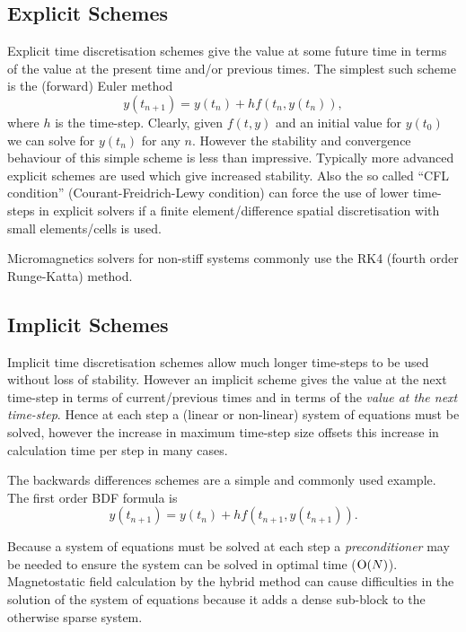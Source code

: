 \subsection{Explicit Schemes}
\label{sec:explicit-schemes}

Explicit time discretisation schemes give the value at some future time in terms of the value at the present time and/or previous times. The simplest such scheme is the (forward) Euler method
\begin{equation}
  \label{eq:44}
  y(t_{n+1}) = y(t_n) + h f(t_n,y(t_n)),
\end{equation}
where $h$ is the time-step. Clearly, given $f(t,y)$ and an initial value for $y(t_0)$ we can solve for $y(t_n)$ for any $n$. However the stability and convergence behaviour of this simple scheme is less than impressive. Typically more advanced explicit schemes are used which give increased stability.\cite{Atkinson2009} Also the so called ``CFL condition'' (Courant-Freidrich-Lewy condition) can force the use of lower time-steps in explicit solvers if a finite element/difference spatial discretisation with small elements/cells is used.

Micromagnetics solvers for non-stiff systems commonly use the RK4 (fourth order Runge-Katta) method.\cite{Suess2002}


\subsection{Implicit Schemes}
\label{sec:implicit-schemes}

Implicit time discretisation schemes allow much longer time-steps to be used without loss of stability. However an implicit scheme gives the value at the next time-step in terms of current/previous times and in terms of the \emph{value at the next time-step}. Hence at each step a (linear or non-linear) system of equations must be solved, however the increase in maximum time-step size offsets this increase in calculation time per step in many cases.

The backwards differences schemes are a simple and commonly used example. The first order BDF formula is
\begin{equation}
  \label{eq:48}
  y(t_{n+1}) = y(t_n) + hf(t_{n+1}, y(t_{n+1})).
\end{equation}

Because a system of equations must be solved at each step a \emph{preconditioner} may be needed to ensure the system can be solved in optimal time (\ie $\text{O}(N)$). Magnetostatic field calculation by the hybrid method can cause difficulties in the solution of the system of equations because it adds a dense sub-block to the otherwise sparse system.

